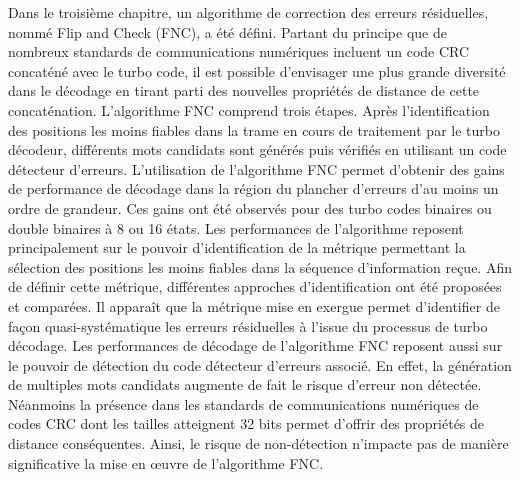 Dans le troisième chapitre, un algorithme de correction des erreurs résiduelles, nommé Flip and Check (FNC), a été défini. 
Partant du principe que de nombreux standards de communications numériques incluent un code CRC concaténé avec le turbo 
code, il est possible d'envisager une plus grande diversité dans le décodage en tirant parti des nouvelles propriétés de 
distance de cette concaténation.
L'algorithme FNC comprend trois étapes. Après l'identification des positions les moins fiables dans la trame en cours de traitement par le turbo décodeur,
différents mots candidats sont générés puis vérifiés en utilisant un code détecteur d'erreurs. L’utilisation de l'algorithme FNC permet d'obtenir 
des gains de performance de décodage dans la région du plancher d'erreurs d'au moins un ordre de 
grandeur. Ces gains ont été observés pour des turbo codes binaires ou double binaires à 8 ou 16 états. Les
performances de l'algorithme reposent principalement sur le pouvoir d'identification de la métrique permettant la sélection des positions
les moins fiables dans la séquence d'information reçue. Afin de définir cette métrique, différentes approches
d'identification ont été proposées et comparées. Il apparaît que la métrique mise en exergue permet d'identifier de 
façon quasi-systématique les erreurs résiduelles à l'issue du processus de turbo décodage. Les performances de décodage de
l'algorithme FNC reposent aussi sur le pouvoir de détection du code détecteur d'erreurs associé. En effet, la génération
de multiples mots candidats augmente de fait le risque d'erreur non détectée. Néanmoins la présence
dans les standards de communications numériques de codes CRC dont les tailles atteignent 32 bits permet d'offrir des propriétés 
de distance conséquentes. Ainsi, le risque de non-détection n'impacte pas de manière significative la mise en œuvre de l'algorithme FNC. 

